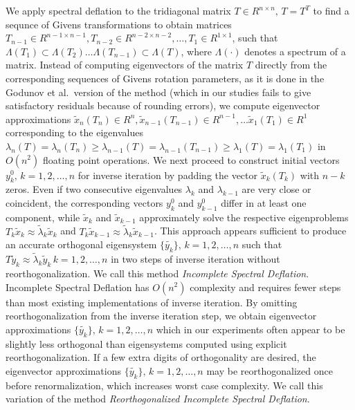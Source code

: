 \documentclass{report}
\begin{document}
We apply spectral deflation to the tridiagonal matrix $T \in
R^{n\times n},\, T = T^T$ to find a sequnce of Givens
transformations to obtain matrices $T_{n-1} \in R^{n-1 \times
n-1}, T_{n-2} \in R^{n-2 \times n-2},\ldots, T_{1} \in R^{1\times
1}$, such that $\Lambda(T_{1}) \subset \Lambda(T_{2})\ldots
\Lambda(T_{n-1}) \subset \Lambda(T)$, where $\Lambda(\cdot)$
denotes a spectrum of a matrix. Instead of computing eigenvectors
of the matrix $T$ directly from the corresponding sequences of
Givens rotation parameters, as it is done in the Godunov et al.\
version of the method (which in our studies fails to give
satisfactory residuals because of rounding errors), we compute
eigenvector approximations $\tilde{x}_n(T_n) \in R^{n},
\tilde{x}_{n-1}(T_{n-1}) \in R^{n-1}, \ldots \tilde{x}_1(T_1) \in
R^{1}$ corresponding to the eigenvalues
$\lambda_n(T)=\lambda_n(T_n) \geq
\lambda_{n-1}(T)=\lambda_{n-1}(T_{n-1}) \geq
\lambda_1(T)=\lambda_1(T_1)$ in $O(n^2)$ floating point
operations. We next proceed to construct initial vectors
${y^0_k},\, k = 1, 2, \ldots, n$ for inverse iteration by padding
the vector $\tilde{x}_k(T_{k})$ with $n-k$ zeros. Even if two
consecutive eigenvalues $\lambda_k$ and $\lambda_{k-1}$ are very
close or coincident, the corresponding vectors ${y^0_k}$ and
${y^0_{k-1}}$ differ in at least one component, while
$\tilde{x}_k$ and $\tilde{x}_{k-1}$ approximately solve the
respective eigenproblems $T_{k} \tilde{x}_{k} \approx
\tilde{\lambda}_{k} \tilde{x}_k$ and $T_{k} \tilde{x}_{k-1}
\approx \tilde{\lambda}_{k} \tilde{x}_{k-1}$. This approach
appears sufficient to produce an accurate orthogonal eigensystem
$\{\tilde{y_k}\},\, k = 1,2, \ldots, n$ such that $T \tilde{y}_k
\approx \tilde{\lambda}_k \tilde{y}_k\, k = 1,2, \ldots, n$ in
two steps of inverse iteration without reorthogonalization. We
call this method \emph{Incomplete Spectral Deflation}.
Incomplete Spectral Deflation has $O(n^2)$ complexity and
requires fewer steps than most existing implementations of
inverse iteration. By omitting reorthogonalization from the
inverse iteration step, we obtain eigenvector approximations
$\{\tilde{y_k}\},\, k = 1,2, \ldots, n$ which in our experiments
often appear to be slightly less orthogonal than eigensystems
computed using explicit reorthogonalization. If a few extra
digits of orthogonality are desired, the eigenvector
approximations $\{\tilde{y_k}\},\, k = 1,2, \ldots, n$ may be
reorthogonalized once before renormalization, which increases
worst case complexity. We call this variation of the method
\emph{Reorthogonalized Incomplete Spectral Deflation}.
\end{document}

